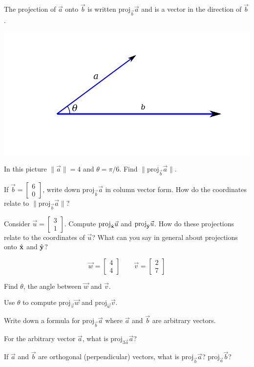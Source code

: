 \documentclass[letter]{article}
\newcommand{\xh}{\hat{\bf x}}
\newcommand{\yh}{\hat{\bf y}}
\newcommand{\proj}{\mathrm{proj}}
\begin{document}
	The projection of $\vec a$ onto $\vec b$ is written $\proj_{\vec b}\vec a$ and is a vector in the direction of $\vec b$.

	\includegraphics{images/projection2.pdf}
	\vspace{-.7in}
	
	\begin{Enum}
		\item In this picture $\|\vec a\|=4$ and $\theta = \pi/6$.  Find $\|\proj_{\vec b}\vec a\|$.
		\item If $\vec b=\begin{bmatrix}6\\0\end{bmatrix}$, write down $\proj_{\vec b}\vec a$ in column vector
		form.  How do the coordinates relate to $\|\proj_{\vec b}\vec a\|$?
		\item Consider $\vec u=\begin{bmatrix}3\\1\end{bmatrix}$.  Compute $\proj_{\xh}\vec u$ and 
		$\proj_{\yh}\vec u$.  How do these projections relate to the coordinates of $\vec u$? What
		can you say in general about projections onto $\xh$ and $\yh$?
	\end{Enum}

	\[
		\vec w = \begin{bmatrix}4\\4\end{bmatrix}\qquad \vec v=\begin{bmatrix}2\\7\end{bmatrix}
	\]
	\begin{Enum}
		\item Find $\theta$, the angle between $\vec w$ and $\vec v$.
		\item Use $\theta$ to compute $\proj_{\vec v}\vec w$ and $\proj_{\vec w}\vec v$.
		\item Write down a formula for $\proj_{\vec b}\vec a$ where $\vec a$ and $\vec b$ are
		arbitrary vectors.
	\end{Enum}
	\begin{Enum}
		\item For the arbitrary vector $\vec a$, what is $\proj_{3\vec a}\vec a$?
		\item If $\vec a$ and $\vec b$ are orthogonal (perpendicular) vectors,
		what is $\proj_{\vec b}\vec a$? $\proj_{\vec a}\vec b$?
	\end{Enum}
	
\end{document}
